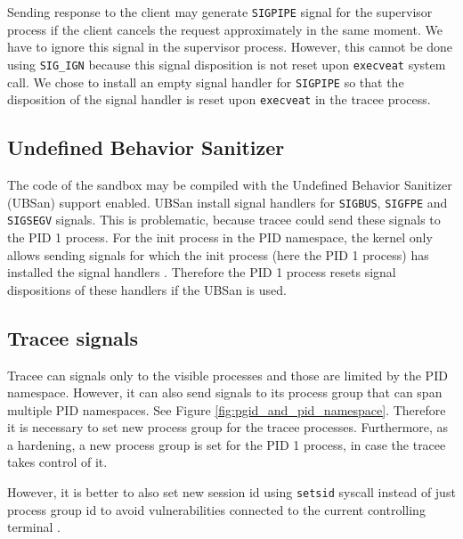 \documentclass[en]{pracamgr}
\begin{document}
Sending response to the client may generate \texttt{SIGPIPE} signal for the supervisor process if the client cancels the request approximately in the same moment. We have to ignore this signal in the supervisor process. However, this cannot be done using \texttt{SIG\_IGN} because this signal disposition is not reset upon \texttt{execveat} system call. We chose to install an empty signal handler for \texttt{SIGPIPE} so that the disposition of the signal handler is reset upon \texttt{execveat} in the tracee process.

\subsection{Undefined Behavior Sanitizer}

The code of the sandbox may be compiled with the Undefined Behavior Sanitizer (UBSan) support enabled. UBSan install signal handlers for \texttt{SIGBUS}, \texttt{SIGFPE} and \texttt{SIGSEGV} signals. This is problematic, because tracee could send these signals to the PID 1 process. For the init process in the PID namespace, the kernel only allows sending signals for which the init process (here the PID 1 process) has installed the signal handlers \cite{man_pid_namespaces}. Therefore the PID 1 process resets signal dispositions of these handlers if the UBSan is used.

\subsection{Tracee signals}

Tracee can signals only to the visible processes and those are limited by the PID namespace. However, it can also send signals to its process group that can span multiple PID namespaces. See Figure \ref{fig:pgid_and_pid_namespace}. Therefore it is necessary to set new process group for the tracee processes. Furthermore, as a hardening, a new process group is set for the PID 1 process, in case the tracee takes control of it.

However, it is better to also set new session id using \texttt{setsid} syscall instead of just process group id to avoid vulnerabilities connected to the current controlling terminal \cite{bubblewrap_cve}.
\end{document}
